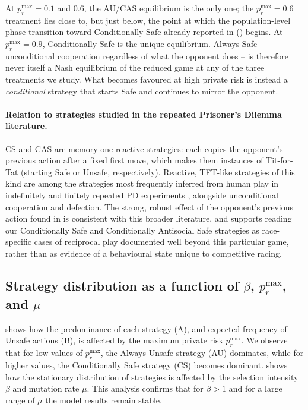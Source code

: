\documentclass[pdflatex,sn-mathphys-ay]{sn-jnl}
\theoremstyle{thmstyleone}
\theoremstyle{thmstyletwo}
\theoremstyle{thmstylethree}
\begin{document}
At \(p_r^{\max}=0.1\) and \(0.6\), the AU/CAS equilibrium is the only one; the \(p_r^{\max}=0.6\) treatment lies close to, but just below, the point at which the population-level phase transition toward Conditionally Safe already reported in  () begins. At \(p_r^{\max}=0.9\), Conditionally Safe is the unique equilibrium. Always Safe -- unconditional cooperation regardless of what the opponent does -- is therefore never itself a Nash equilibrium of the reduced game at any of the three treatments we study. What becomes favoured at high private risk is instead a \emph{conditional} strategy that starts Safe and continues to mirror the opponent.

\paragraph{Relation to strategies studied in the repeated Prisoner's Dilemma literature.} CS and CAS are memory-one reactive strategies: each copies the opponent's previous action after a fixed first move, which makes them instances of Tit-for-Tat (starting Safe or Unsafe, respectively). Reactive, TFT-like strategies of this kind are among the strategies most frequently inferred from human play in indefinitely and finitely repeated PD experiments \citep{dal2018determinants,monteroPorras2022inferringStrategies}, alongside unconditional cooperation and defection. The strong, robust effect of the opponent's previous action found in  is consistent with this broader literature, and supports reading our Conditionally Safe and Conditionally Antisocial Safe strategies as race-specific cases of reciprocal play documented well beyond this particular game, rather than as evidence of a behavioural state unique to competitive racing.

\subsection{Strategy distribution as a function of \texorpdfstring{$\beta$}{beta}, \texorpdfstring{$p_r^{\max}$}{pr max}, and \texorpdfstring{$\mu$}{mu}}
\label{si:sec:strategy-distribution}

 shows how the predominance of each strategy (A), and expected frequency of Unsafe actions (B), is affected by the maximum private risk \(p_r^{\max}\). We observe that for low values of \(p_r^{\max}\), the Always Unsafe strategy (AU) dominates, while for higher values, the Conditionally Safe strategy (CS) becomes dominant.  shows how the stationary distribution of strategies is affected by the selection intensity \(\beta\) and mutation rate \(\mu\). This analysis confirms that for \(\beta>1\) and for a large range of \(\mu\) the model results remain stable.
\end{document}
